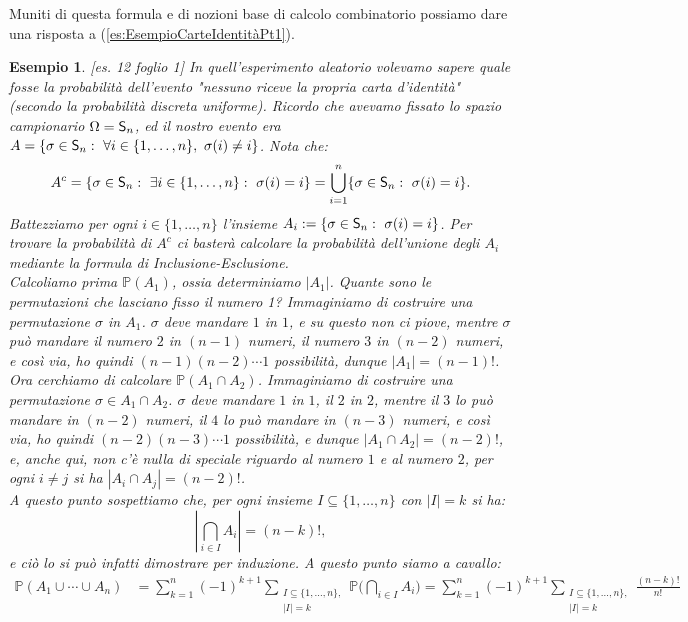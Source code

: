 \documentclass[11pt]{book}
\theoremstyle{Definizione}
\theoremstyle{TeoremaProposizioneLemmaCorollario}
\theoremstyle{OsservazioneNota}
\newtheorem{myes}{Esempio}[section]
\renewcommand{\P}{\mathbb{P}}
\newcommand{\Sym}[1]{\textup{\textsf{S}}_{#1}}
\begin{document}
\noindent
Muniti di questa formula e di nozioni base di calcolo combinatorio possiamo dare una risposta a (\ref{es:EsempioCarteIdentitàPt1}).
\begin{myes}\label{es:EsempioCarteIdentitàPt2}
[es. 12 foglio 1] In quell'esperimento aleatorio volevamo sapere quale fosse la probabilità dell'evento "nessuno riceve la propria carta d'identità" (secondo la probabilità discreta uniforme). Ricordo che avevamo fissato lo spazio campionario $\Omega = \Sym{n}$, ed il nostro evento era $A = \{\sigma \in \Sym{n}:\ \forall i\in \{1,\dots,n\},\ \sigma(i) \neq i\}$. Nota che:
$$
A^c = \{\sigma\in \Sym{n}:\ \exists i\in \{1,\dots,n\}:\ \sigma(i) = i\} = \bigcup_{i = 1}^n \{\sigma \in \Sym{n}:\ \sigma(i) = i\}.
$$
Battezziamo per ogni $i \in \{1,\dots,n\}$ l'insieme $A_i := \{\sigma\in \Sym{n}:\ \sigma(i)  = i\}$. Per trovare la probabilità di $A^c$ ci basterà calcolare la probabilità dell'unione degli $A_i$ mediante la formula di Inclusione-Esclusione.\\
Calcoliamo prima $\P(A_1)$, ossia determiniamo $|A_1|$. Quante sono le permutazioni che lasciano fisso il numero 1? Immaginiamo di costruire una permutazione $\sigma$ in $A_1$. $\sigma$ deve mandare $1$ in $1$, e su questo non ci piove, mentre $\sigma$ può mandare il numero $2$ in $(n-1)$ numeri, il numero $3$ in $(n-2)$ numeri, e così via, ho quindi $(n-1)(n-2)\cdots 1$ possibilità, dunque $|A_1| = (n-1)!$. Ora cerchiamo di calcolare $\P(A_1\cap A_2)$. Immaginiamo di costruire una permutazione $\sigma\in A_1 \cap A_2$. $\sigma$ deve mandare $1$ in $1$, il $2$ in $2$, mentre il $3$ lo può mandare in $(n-2)$ numeri, il $4$ lo può mandare in $(n-3)$ numeri, e così via, ho quindi $(n-2)(n-3)\cdots 1$ possibilità, e dunque $|A_1\cap A_2| = (n-2)!$, e, anche qui, non c'è nulla di speciale riguardo al numero $1$ e al numero $2$, per ogni $i\neq j$ si ha $|A_i\cap A_j| = (n-2)!$.\\
A questo punto sospettiamo che, per ogni insieme $I \subseteq \{1,\dots,n\}$ con $|I| = k$ si ha:
$$
\left|\bigcap_{i\in I} A_i\right| = (n-k)!,
$$
e ciò lo si può infatti dimostrare per induzione. A questo punto siamo a cavallo:
\begin{align*}
\P(A_1 \cup \cdots \cup A_n) &= \sum_{k = 1}^n (-1)^{k+1} \sum_{\substack{ I \subseteq \{1,\dots,n\},\\ |I| = k}} \P\Bigg(\bigcap_{i\in I} A_i\Bigg) = \sum_{k = 1}^n (-1)^{k+1} \sum_{\substack{ I \subseteq \{1,\dots,n\},\\ |I| = k}} \frac{(n-k)!}{n!}\\

\end{align*}
\end{myes}
\end{document}
